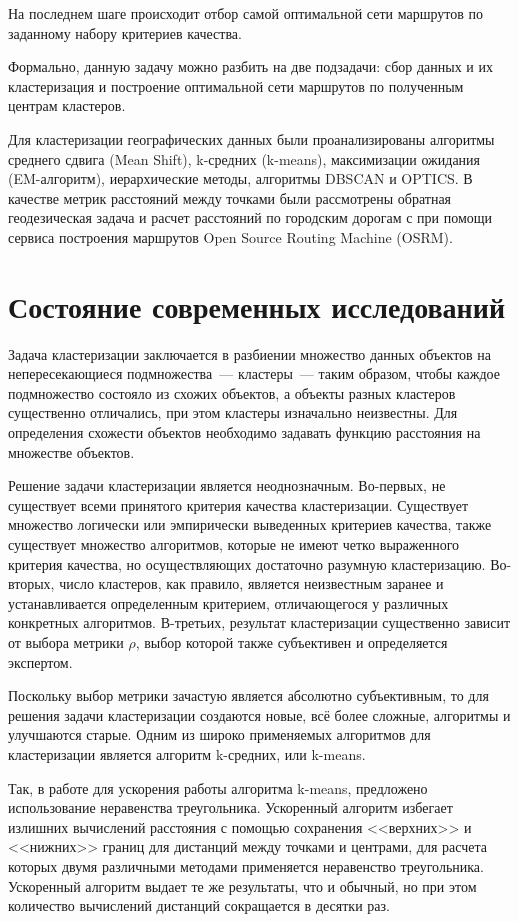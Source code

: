 На последнем шаге происходит отбор самой оптимальной сети маршрутов по заданному набору критериев качества.

Формально, данную задачу можно разбить на две подзадачи: сбор данных и их кластеризация и построение оптимальной сети маршрутов по полученным центрам кластеров.

Для кластеризации географических данных были проанализированы алгоритмы среднего сдвига (Mean Shift), k-средних (k-means), максимизации ожидания (EM-алгоритм), иерархические методы, алгоритмы DBSCAN и OPTICS. В качестве метрик расстояний между точками были рассмотрены обратная геодезическая задача и расчет расстояний по городским дорогам с при помощи сервиса построения маршрутов Open Source Routing Machine (OSRM).

\section{Состояние современных исследований}
Задача кластеризации заключается в разбиении множество данных объектов на непересекающиеся подмножества~--- кластеры~--- таким образом, чтобы каждое подмножество состояло из схожих объектов, а объекты разных кластеров существенно отличались, при этом кластеры изначально неизвестны. Для определения схожести объектов необходимо задавать функцию расстояния на множестве объектов.

Решение задачи кластеризации является неоднозначным. Во-первых, не существует всеми принятого критерия качества кластеризации. Существует множество логически или эмпирически выведенных критериев качества, также существует множество алгоритмов, которые не имеют четко выраженного критерия качества, но осуществляющих достаточно разумную кластеризацию. Во-вторых, число кластеров, как правило, является неизвестным заранее и устанавливается определенным критерием, отличающегося у различных конкретных алгоритмов. В-третьих, результат кластеризации существенно зависит от выбора метрики \( \rho \), выбор которой также субъективен и определяется экспертом. \cite{voron, fraley}

Поскольку выбор метрики зачастую является абсолютно субъективным, то для решения задачи кластеризации создаются новые, всё более сложные, алгоритмы и улучшаются старые.
Одним из широко применяемых алгоритмов для кластеризации является алгоритм k-средних, или k-means. \cite{elcan, kanungo, likas, hybrid, lenka, approxkm, krishna}

Так, в работе \cite{elcan} для ускорения работы алгоритма k-means, предложено использование неравенства треугольника. Ускоренный алгоритм избегает излишних вычислений расстояния с помощью сохранения <<верхних>> и <<нижних>> границ для дистанций между точками и центрами, для расчета которых двумя различными методами применяется неравенство треугольника. Ускоренный алгоритм выдает те же результаты, что и обычный, но при этом количество вычислений дистанций сокращается в десятки раз.

